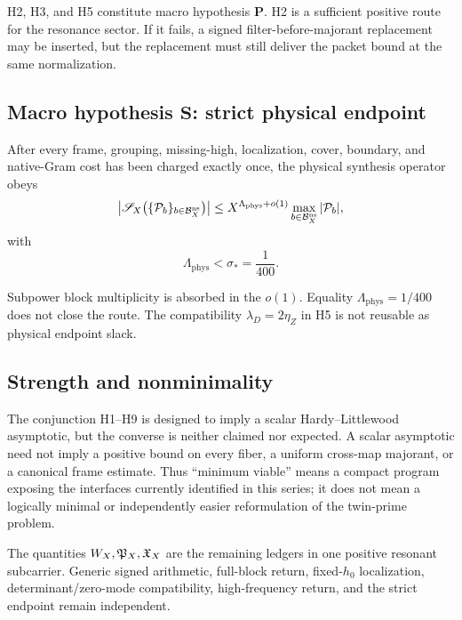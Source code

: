 H2, H3, and H5 constitute macro hypothesis \(\mathbf P\).  H2 is a
sufficient positive route for the resonance sector.  If it fails, a
signed filter-before-majorant replacement may be inserted, but the
replacement must still deliver the packet bound at the same
normalization.

\subsection{Macro hypothesis
\texorpdfstring{\(\mathbf S\)}{S}: strict physical endpoint}

\begin{hypothesis}
\label{hyp:endpoint}
After every frame, grouping, missing-high, localization, cover,
boundary, and native-Gram cost has been charged exactly once, the
physical synthesis operator obeys
\[
\left|
\mathscr S_X\bigl(\{\mathcal P_b\}_{b\in\mathcal B_X^{\mathrm{ns}}}\bigr)
\right|
\le
X^{\Lambda_{\mathrm{phys}}+o(1)}
\max_{b\in\mathcal B_X^{\mathrm{ns}}}|\mathcal P_b|,
\]
with
\[
\Lambda_{\mathrm{phys}}<\sigma_*=\frac1{400}.
\]
\end{hypothesis}

Subpower block multiplicity is absorbed in the \(o(1)\).  Equality
\(\Lambda_{\mathrm{phys}}=1/400\) does not close the route.  The
compatibility \(\lambda_D=2\eta_Z\) in H5 is not reusable as physical
endpoint slack.

\subsection{Strength and nonminimality}

\begin{remark}
The conjunction H1--H9 is designed to imply a scalar
Hardy--Littlewood asymptotic, but the converse is neither claimed nor
expected.  A scalar asymptotic need not imply a positive bound on
every fiber, a uniform cross-map majorant, or a canonical frame
estimate.  Thus ``minimum viable'' means a compact program exposing
the interfaces currently identified in this series; it does not mean
a logically minimal or independently easier reformulation of the
twin-prime problem.
\end{remark}

\begin{remark}
The quantities \(W_X,\mathfrak P_X,\mathfrak X_X\) are the remaining ledgers in one
positive resonant subcarrier.  Generic signed arithmetic, full-block
return, fixed-\(h_0\) localization, determinant/zero-mode
compatibility, high-frequency return, and the strict endpoint remain
independent.
\end{remark}
